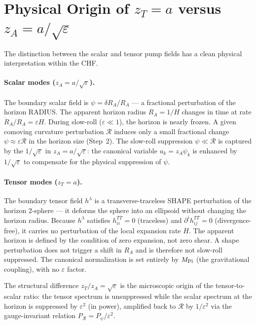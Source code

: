\documentclass[12pt,a4paper]{article}
\begin{document}
\section{Physical Origin of $z_T = a$ versus $z_A = a/\sqrt\varepsilon$}

The distinction between the scalar and tensor pump fields has a clean physical interpretation within the CHF.

\paragraph{Scalar modes ($z_A = a/\sqrt\varepsilon$).} The boundary scalar field is $\psi = \delta R_A/R_A$ --- a fractional perturbation of the horizon RADIUS. The apparent horizon radius $R_A = 1/H$ changes in time at rate $\dot R_A/R_A = \varepsilon H$. During slow-roll ($\varepsilon \ll 1$), the horizon is nearly frozen. A given comoving curvature perturbation $\mathcal{R}$ induces only a small fractional change $\psi \approx \varepsilon\mathcal{R}$ in the horizon size (Step~2). The slow-roll suppression $\psi \ll \mathcal{R}$ is captured by the $1/\sqrt\varepsilon$ in $z_A = a/\sqrt\varepsilon$: the canonical variable $u_k = z_A\psi_k$ is enhanced by $1/\sqrt\varepsilon$ to compensate for the physical suppression of $\psi$.

\paragraph{Tensor modes ($z_T = a$).} The boundary tensor field $h^\lambda$ is a transverse-traceless SHAPE perturbation of the horizon 2-sphere --- it deforms the sphere into an ellipsoid without changing the horizon radius. Because $h^\lambda$ satisfies $h^{TT}_{ii} = 0$ (traceless) and $\partial^i h_{ij}^{TT} = 0$ (divergence-free), it carries no perturbation of the local expansion rate $H$. The apparent horizon is defined by the condition of zero expansion, not zero shear. A shape perturbation does not trigger a shift in $R_A$ and is therefore not slow-roll suppressed. The canonical normalization is set entirely by $M_{\rm Pl}$ (the gravitational coupling), with no $\varepsilon$ factor.

The structural difference $z_T/z_A = \sqrt\varepsilon$ is the microscopic origin of the tensor-to-scalar ratio: the tensor spectrum is unsuppressed while the scalar spectrum at the horizon is suppressed by $\varepsilon^2$ (in power), amplified back to $\mathcal{R}$ by $1/\varepsilon^2$ via the gauge-invariant relation $P_\mathcal{R} = P_\psi/\varepsilon^2$.
\end{document}
